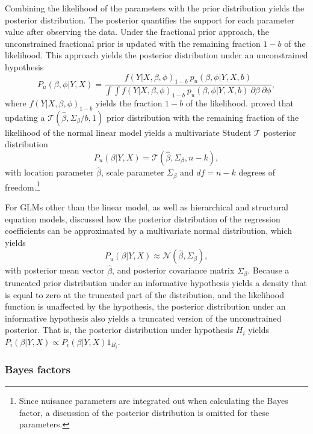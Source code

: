 \documentclass[
  authoryear,
  preprint,
  5p,
  twocolumn]{elsarticle}
\begin{document}
Combining the likelihood of the parameters with the prior distribution
yields the posterior distribution. The posterior quantifies the support
for each parameter value after observing the data. Under the fractional
prior approach, the unconstrained fractional prior is updated with the
remaining fraction \(1-b\) of the likelihood. This approach yields the
posterior distribution under an unconstrained hypothesis \[
P_u(\beta, \phi | Y, X) = 
\frac{
f(Y | X, \beta, \phi)_{1-b} ~ p_u(\beta, \phi | Y, X, b)
}{
\int \int f(Y | X, \beta, \phi)_{1-b} ~ p_u(\beta, \phi | Y, X, b) ~ \partial \beta ~ \partial \phi
},
\] where \(f(Y | X, \beta, \phi)_{1-b}\) yields the fraction \(1-b\) of
the likelihood. \citet{mulder_olssoncollentine_2019} proved that
updating a \(\mathcal{T}(\hat{\beta}, \Sigma_\beta / b, 1)\) prior
distribution with the remaining fraction of the likelihood of the normal
linear model yields a multivariate Student \(\mathcal{T}\) posterior
distribution \[
P_u(\beta | Y, X) = \mathcal{T}(\hat{\beta}, \Sigma_\beta, n - k),
\] with location parameter \(\hat{\beta}\), scale parameter
\(\Sigma_{\beta}\) and \(df = n - k\) degrees of freedom.\footnote{Since
  nuisance parameters are integrated out when calculating the Bayes
  factor, a discussion of the posterior distribution is omitted for
  these parameters.}

For GLMs other than the linear model, as well as hierarchical and
structural equation models, \citet{gu_approximated_2018} discussed how
the posterior distribution of the regression coefficients can be
approximated by a multivariate normal distribution, which yields \[
P_u(\beta | Y, X) \approx \mathcal{N}(\hat{\beta}, \Sigma_\beta),
\] with posterior mean vector \(\hat{\beta}\), and posterior covariance
matrix \(\Sigma_\beta\). Because a truncated prior distribution under an
informative hypothesis yields a density that is equal to zero at the
truncated part of the distribution, and the likelihood function is
unaffected by the hypothesis, the posterior distribution under an
informative hypothesis also yields a truncated version of the
unconstrained posterior. That is, the posterior distribution under
hypothesis \(H_i\) yields
\(P_i(\beta | Y, X) \propto P_i(\beta | Y, X)1_{B_i}\).

\hypertarget{bayes-factors}{%
\subsubsection{Bayes factors}\label{bayes-factors}}
\end{document}
